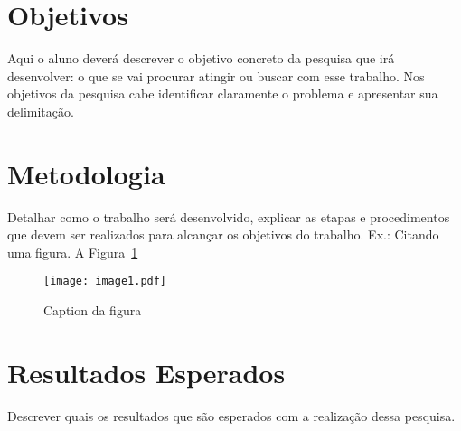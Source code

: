 \documentclass[portuguese]{sbrt}
\begin{document}
\section{Objetivos}
\label{sec:objetivos}
  
Aqui o aluno deverá descrever o objetivo concreto da pesquisa que irá desenvolver: o que se vai procurar atingir ou buscar com esse trabalho. Nos objetivos da pesquisa cabe identificar claramente o problema e apresentar sua delimitação. 


\section{Metodologia} 
\label{sec:metodologia}

Detalhar como o trabalho será desenvolvido, explicar as etapas e procedimentos que devem ser realizados para alcançar os objetivos do trabalho.
Ex.: Citando uma figura. A Figura~\ref{fig:teste}

\begin{figure}[htb]
  \centering
  \texttt{[image: image1.pdf]}
  \caption{Caption da figura}
  \label{fig:teste}
\end{figure}


\section{Resultados Esperados}

Descrever quais os resultados que são esperados com a realização dessa pesquisa. 
  
 

  
\end{document}
